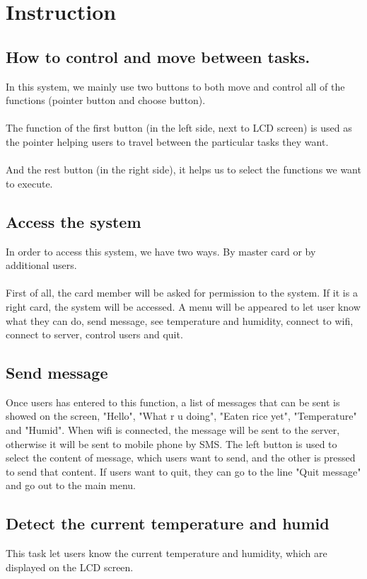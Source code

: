 \documentclass[12pt, a4paper, oneside]{article}
\begin{document}
\clearpage
\section{Instruction}
\subsection{How to control and move between tasks.  }
In this system, we mainly use two buttons to both move and control all of the functions (pointer button and choose button).\\
\\
The function of the first button (in the left side, next to LCD screen) is used as the pointer helping users to travel between the particular tasks they want.\\
\\
And the rest button (in the right side), it helps us to select the functions we want to execute.    
\subsection{Access the system}
In order to access this system, we have two ways. By master card or by additional users. \\
\\
First of all, the card member will be asked for permission to the system. If it is a right card, the system will be accessed.
A menu will be appeared to let user know what they can do, send message, see temperature and humidity, connect to wifi, connect to server, control users and quit.
\subsection{Send message}
Once users has entered to this function, a list of messages that can be sent is showed on the screen, "Hello", "What r u doing", "Eaten rice yet", "Temperature" and "Humid". When wifi is connected, the message will be sent to the server, otherwise it will be sent to mobile phone by SMS. The left button is used to select the content of message, which users want to send, and the other is pressed to send that content. If users want to quit, they can go to the line "Quit message" and go out to the main menu.

\subsection{Detect the current temperature and humid}
This task let users know the current temperature and humidity, which are displayed on the LCD screen.
\end{document}
